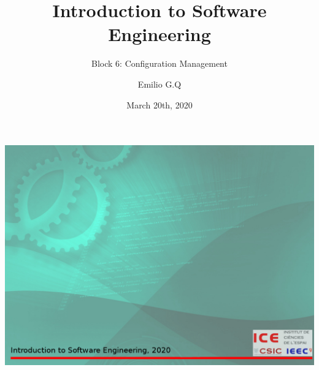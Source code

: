 \graphicspath{ {fig/} }
\title{Introduction to Software Engineering}
\subtitle{Block 6: Configuration Management}
\author{Emilio G.Q}
\date{March 20th, 2020}

\usebackgroundtemplate%
{%
    \includegraphics[width=\paperwidth,height=\paperheight]{background.jpg}%
}
